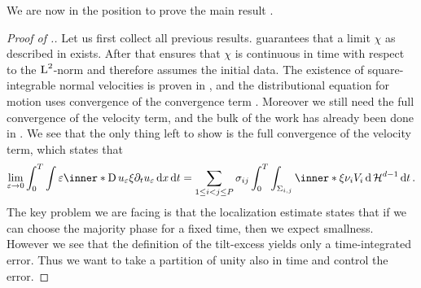 We are now in the position to prove the main result 
.

\begin{proof}[Proof of .]
	Let us first collect all previous results.
	 guarantees that a limit $ \chi 
	$  as described in  exists.
	After that  ensures that 
	$ \chi $ is continuous in time with respect to the $ \operatorname{L}^{ 2 } $-norm and 
	therefore assumes the initial data. The existence of square-integrable 
	normal velocities is proven in 
	, and the 
	distributional equation for motion uses convergence of the convergence term 
	. Moreover we still need the full 
	convergence of the velocity term, and the bulk of the work has already been 
	done in .
	We see that the only thing left to show is the full convergence 
	of the velocity term, which states that
	\begin{equation*}
		\lim_{ \varepsilon \to 0 }
			\int_{ 0 }^{ T }
				\int
					\varepsilon
					\inner*{ \diff u_{ \varepsilon } \xi }{ \partial_{ t } u_{ 
					\varepsilon } }
				\dd{ x }
			\dd{ t }
		=
		\sum_{ 1 \leq i < j \leq P }
			\sigma_{ i j }
			\int_{ 0 }^{ T }
				\int_{ \Sigma_{ i , j } }
					\inner*{ \xi }{ \nu_{ i } }
					V_{ i }
				\dd{ \hm^{ d - 1 } }
			\dd{ t }.
	\end{equation*} 
	The key problem we are facing is that the localization estimate 
	 states that if we can choose the 
	majority phase for a fixed time, then we expect smallness. However we see 
	that the definition of the tilt-excess yields only a time-integrated error. 
	Thus we want to take a partition of unity also in time and control the 
	error.
	

\end{proof}
